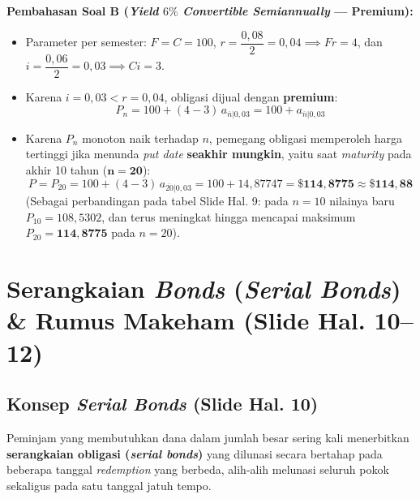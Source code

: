 \documentclass[11pt,a4paper]{article}
\begin{document}
\begin{examplebox}
\medskip
\noindent\textbf{Pembahasan Soal B (\textit{Yield} $6\%$ \textit{Convertible Semiannually} --- Premium):}
\begin{itemize}[topsep=2pt, itemsep=2pt]
    \item Parameter per semester: $F = C = 100$, $r = \dfrac{0{,}08}{2} = 0{,}04 \implies Fr = 4$, dan $i = \dfrac{0{,}06}{2} = 0{,}03 \implies Ci = 3$.
    \item Karena $i = 0{,}03 < r = 0{,}04$, obligasi dijual dengan \textbf{premium}:
    \[
        P_n = 100 + (4 - 3)\,a_{\overline{n}|0{,}03} = 100 + a_{\overline{n}|0{,}03}
    \]
    \item Karena $P_n$ monoton naik terhadap $n$, pemegang obligasi memperoleh harga tertinggi jika menunda \textit{put date} \textbf{seakhir mungkin}, yaitu saat \textit{maturity} pada akhir 10 tahun ($\mathbf{n = 20}$):
    \[
        P = P_{20} = 100 + (4 - 3)\,a_{\overline{20}|0{,}03} = 100 + 14{,}87747 = \mathbf{\$114{,}8775 \approx \$114{,}88}
    \]
    {\footnotesize (Sebagai perbandingan pada tabel Slide Hal. 9: pada $n=10$ nilainya baru $P_{10} = 108{,}5302$, dan terus meningkat hingga mencapai maksimum $P_{20} = \mathbf{114{,}8775}$ pada $n=20$).}
\end{itemize}
\end{examplebox}

\section{Serangkaian \textit{Bonds} (\textit{Serial Bonds}) \& Rumus Makeham (Slide Hal. 10--12)}

\subsection{Konsep \textit{Serial Bonds} (Slide Hal. 10)}

Peminjam yang membutuhkan dana dalam jumlah besar sering kali menerbitkan \textbf{serangkaian obligasi (\textit{serial bonds})} yang dilunasi secara bertahap pada beberapa tanggal \textit{redemption} yang berbeda, alih-alih melunasi seluruh pokok sekaligus pada satu tanggal jatuh tempo.
\end{document}

